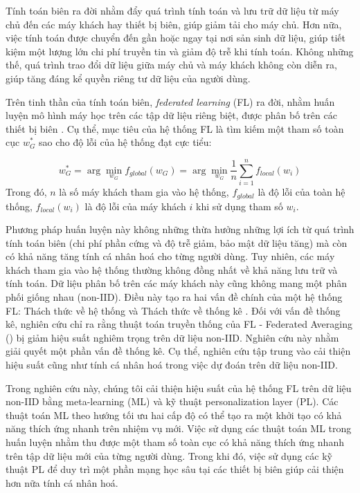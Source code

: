 \documentclass[runningheads]{llncs}
\begin{document}
Tính toán biên \cite{khan2019edge} ra đời nhằm đẩy quá trình tính toán và lưu trữ dữ liệu từ máy chủ đến các máy khách hay thiết bị biên, giúp giảm tải cho máy chủ. Hơn nữa, việc tính toán được chuyển đến gần hoặc ngay tại nơi sản sinh dữ liệu, giúp tiết kiệm một lượng lớn chi phí truyền tin và giảm độ trễ khi tính toán. Không những thế, quá trình trao đổi dữ liệu giữa máy chủ và máy khách không còn diễn ra, giúp tăng đáng kể quyền riêng tư dữ liệu của người dùng.

Trên tinh thần của tính toán biên, \textit{federated learning} (FL) \cite{mcmahan2017communication} ra đời, nhằm huấn luyện mô hình máy học trên các tập dữ liệu riêng biệt, được phân bố trên các thiết bị biên \cite{yin2021comprehensive}. Cụ thể, mục tiêu của hệ thống FL là tìm kiếm một tham số toàn cục $w_G^*$ sao cho độ lỗi của hệ thống đạt cực tiểu:

\begin{dmath}
    w_G^* = \arg\min_{w_G}{f_{global}(w_G)}
        = \arg\min_{w_G}{\frac{1}{n} \sum_{i=1}^n{f_{local}(w_i)}}
\end{dmath} Trong đó, $n$ là số máy khách tham gia vào hệ thống, $f_{global}$ là độ lỗi của toàn hệ thống, $f_{local}(w_i)$ là độ lỗi của máy khách $i$ khi sử dụng tham số $w_i$. 

Phương pháp huấn luyện này không những thừa hưởng những lợi ích từ quá trình tính toán biên (chi phí phần cứng và độ trễ giảm, bảo mật dữ liệu tăng) mà còn có khả năng tăng tính cá nhân hoá cho từng người dùng. Tuy nhiên, các máy khách tham gia vào hệ thống thường không đồng nhất về khả năng lưu trữ và tính toán. Dữ liệu phân bố trên các máy khách này cũng không mang một phân phối giống nhau (non-IID). Điều này tạo ra hai vấn đề chính của một hệ thống FL: Thách thức về hệ thống và Thách thức về thống kê \cite{li2020federated}. Đối với vấn đề thống kê, nghiên cứu \cite{zhao2018federated} chỉ ra rằng thuật toán truyền thống của FL - Federated Averaging () bị giảm hiệu suất nghiêm trọng trên dữ liệu non-IID. Nghiên cứu này nhằm giải quyết một phần vấn đề thống kê. Cụ thể, nghiên cứu tập trung vào cải thiện hiệu suất cũng như tính cá nhân hoá trong việc dự đoán trên dữ liệu non-IID.

Trong nghiên cứu này, chúng tôi cải thiện hiệu suất của hệ thống FL trên dữ liệu non-IID bằng meta-learning (ML) \cite{hospedales2020meta} và kỹ thuật personalization layer (PL). Các thuật toán ML theo hướng tối ưu hai cấp độ có thể tạo ra một khởi tạo có khả năng thích ứng nhanh trên nhiệm vụ mới. Việc sử dụng các thuật toán ML trong huấn luyện nhằm thu được một tham số toàn cục có khả năng thích ứng nhanh trên tập dữ liệu mới của từng người dùng. Trong khi đó, việc sử dụng các kỹ thuật PL để duy trì một phần mạng học sâu tại các thiết bị biên giúp cải thiện hơn nữa tính cá nhân hoá.
\end{document}
